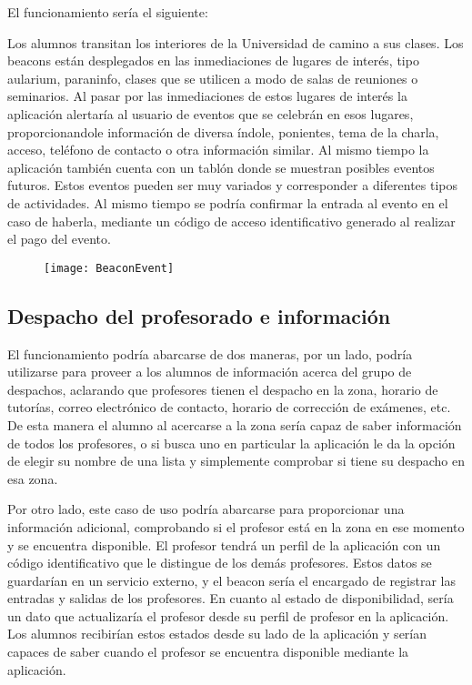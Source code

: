 El funcionamiento sería el siguiente: 

Los alumnos transitan los interiores de la Universidad de camino a sus clases. Los beacons están desplegados en las inmediaciones de lugares de interés, tipo aularium, paraninfo, clases que se utilicen a modo de salas de reuniones o seminarios. Al pasar por las inmediaciones de estos lugares de interés la aplicación alertaría al usuario de eventos que se celebrán en esos lugares, proporcionandole información de diversa índole, ponientes, tema de la charla, acceso, teléfono de contacto o otra información similar.  Al mismo tiempo la aplicación también cuenta con un tablón donde se muestran posibles eventos futuros. Estos eventos pueden ser muy variados y corresponder a diferentes tipos de actividades. Al mismo tiempo se podría confirmar la entrada al evento en el caso de haberla, mediante un código de acceso identificativo generado al realizar el pago del evento.

\begin{figure}[H]
	\centering
	\texttt{[image: BeaconEvent]}
	\label{fig:eventBeacon}
\end{figure}

\subsection{Despacho del profesorado e información}

El funcionamiento podría abarcarse de dos maneras, por un lado, podría utilizarse para proveer a los alumnos de información acerca del grupo de despachos, aclarando que profesores tienen el despacho en la zona, horario de tutorías, correo electrónico de contacto, horario de corrección de exámenes, etc. De esta manera el alumno al acercarse a la zona sería capaz de saber información de todos los profesores, o si busca uno en particular la aplicación le da la opción de elegir su nombre de una lista y simplemente comprobar si tiene su despacho en esa zona. 

Por otro lado, este caso de uso podría abarcarse para proporcionar una información adicional, comprobando si el profesor está en la zona en ese momento y se encuentra disponible. El profesor tendrá un perfil de la aplicación con un código identificativo que le distingue de los demás profesores. Estos datos se guardarían en un servicio externo, y el beacon sería el encargado de registrar las entradas y salidas de los profesores. En cuanto al estado de disponibilidad, sería un dato que actualizaría el profesor desde su perfil de profesor en la aplicación. Los alumnos recibirían estos estados desde su lado de la aplicación y serían capaces de saber cuando el profesor se encuentra disponible mediante la aplicación. 

